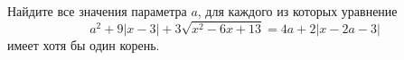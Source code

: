 \begin{ex}
	\begin{condition}
		Найдите все значения параметра \( a \), для каждого из которых уравнение \[ a^2+9|x-3|+3\sqrt{x^2-6x+13}=4a+2|x-2a-3| \] имеет хотя бы один корень.
	\end{condition}
\end{ex}